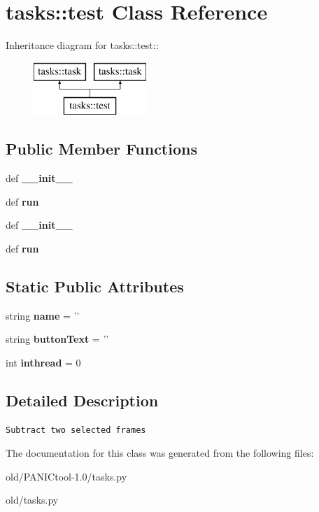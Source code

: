 \section{tasks::test Class Reference}
\label{classtasks_1_1test}
Inheritance diagram for tasks::test::\begin{figure}[H]
\begin{center}
\leavevmode
\includegraphics[height=2cm]{classtasks_1_1test}
\end{center}
\end{figure}
\subsection*{Public Member Functions}
\begin{CompactItemize}
\item 
def \textbf{\_\-\_\-init\_\-\_\-}\label{classtasks_1_1test_0cb323f022fd44123c950b76f061e776}

\item 
def \textbf{run}\label{classtasks_1_1test_798d0bc762bfddaef6de0058a4acf86f}

\item 
def \textbf{\_\-\_\-init\_\-\_\-}\label{classtasks_1_1test_0cb323f022fd44123c950b76f061e776}

\item 
def \textbf{run}\label{classtasks_1_1test_798d0bc762bfddaef6de0058a4acf86f}

\end{CompactItemize}
\subsection*{Static Public Attributes}
\begin{CompactItemize}
\item 
string \textbf{name} = '{\bftest}'\label{classtasks_1_1test_fedc868815b9ee3fcd3dde2b0acef22f}

\item 
string \textbf{button\-Text} = '{\bftest}'\label{classtasks_1_1test_d29763969e4128804e59324dee960c05}

\item 
int \textbf{inthread} = 0\label{classtasks_1_1test_d481510e691b04fbff713c2662a73c9e}

\end{CompactItemize}


\subsection{Detailed Description}


\footnotesize\begin{verbatim}Subtract two selected frames
\end{verbatim}
\normalsize
 



The documentation for this class was generated from the following files:\begin{CompactItemize}
\item 
old/PANICtool-1.0/tasks.py\item 
old/tasks.py\end{CompactItemize}
